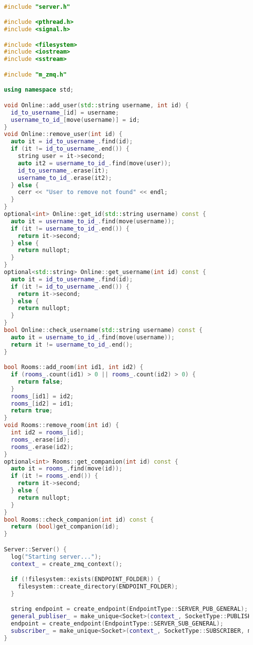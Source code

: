 \begin{lstlisting}[language=C++]

#include "server.h"

#include <pthread.h>
#include <signal.h>

#include <filesystem>
#include <iostream>
#include <sstream>

#include "m_zmq.h"

using namespace std;

void Online::add_user(std::string username, int id) {
  id_to_username_[id] = username;
  username_to_id_[move(username)] = id;
}
void Online::remove_user(int id) {
  auto it = id_to_username_.find(id);
  if (it != id_to_username_.end()) {
    string user = it->second;
    auto it2 = username_to_id_.find(move(user));
    id_to_username_.erase(it);
    username_to_id_.erase(it2);
  } else {
    cerr << "User to remove not found" << endl;
  }
}
optional<int> Online::get_id(std::string username) const {
  auto it = username_to_id_.find(move(username));
  if (it != username_to_id_.end()) {
    return it->second;
  } else {
    return nullopt;
  }
}
optional<std::string> Online::get_username(int id) const {
  auto it = id_to_username_.find(id);
  if (it != id_to_username_.end()) {
    return it->second;
  } else {
    return nullopt;
  }
}
bool Online::check_username(std::string username) const {
  auto it = username_to_id_.find(move(username));
  return it != username_to_id_.end();
}

bool Rooms::add_room(int id1, int id2) {
  if (rooms_.count(id1) > 0 || rooms_.count(id2) > 0) {
    return false;
  }
  rooms_[id1] = id2;
  rooms_[id2] = id1;
  return true;
}
void Rooms::remove_room(int id) {
  int id2 = rooms_[id];
  rooms_.erase(id);
  rooms_.erase(id2);
}
optional<int> Rooms::get_companion(int id) const {
  auto it = rooms_.find(move(id));
  if (it != rooms_.end()) {
    return it->second;
  } else {
    return nullopt;
  }
}
bool Rooms::check_companion(int id) const {
  return (bool)get_companion(id);
}

Server::Server() {
  log("Starting server...");
  context_ = create_zmq_context();

  if (!filesystem::exists(ENDPOINT_FOLDER)) {
    filesystem::create_directory(ENDPOINT_FOLDER);
  }

  string endpoint = create_endpoint(EndpointType::SERVER_PUB_GENERAL);
  general_publiser_ = make_unique<Socket>(context_, SocketType::PUBLISHER, move(endpoint));
  endpoint = create_endpoint(EndpointType::SERVER_SUB_GENERAL);
  subscriber_ = make_unique<Socket>(context_, SocketType::SUBSCRIBER, move(endpoint));
}


\end{lstlisting}
